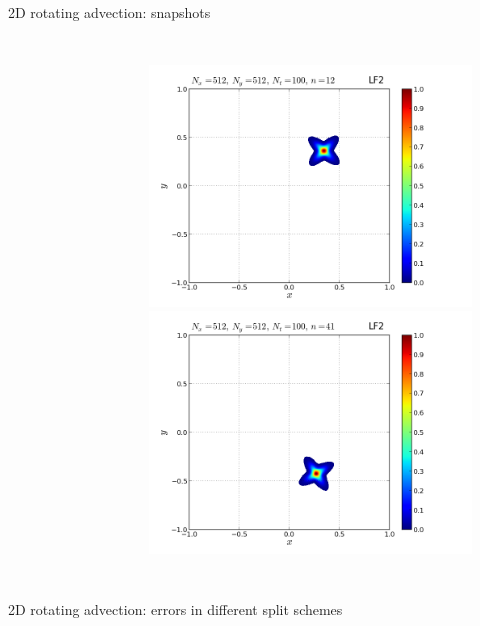\documentclass{beamer}
\begin{document}
\begin{frame}{2D rotating advection: snapshots}
\begin{columns}
\begin{figure}
\end{figure}
\begin{figure}
\centering
 \includegraphics[width=\textwidth]{graphics/plot_-_flower_F12_LF2_Nx512Nt100_it00012}\\ \vspace*{-4mm}
 \includegraphics[width=\textwidth]{graphics/plot_-_flower_F12_LF2_Nx512Nt100_it00041}
\end{figure}
 \end{columns}

\end{frame}

\begin{frame}{2D rotating advection: errors in different split schemes}

\end{frame}
\end{document}
